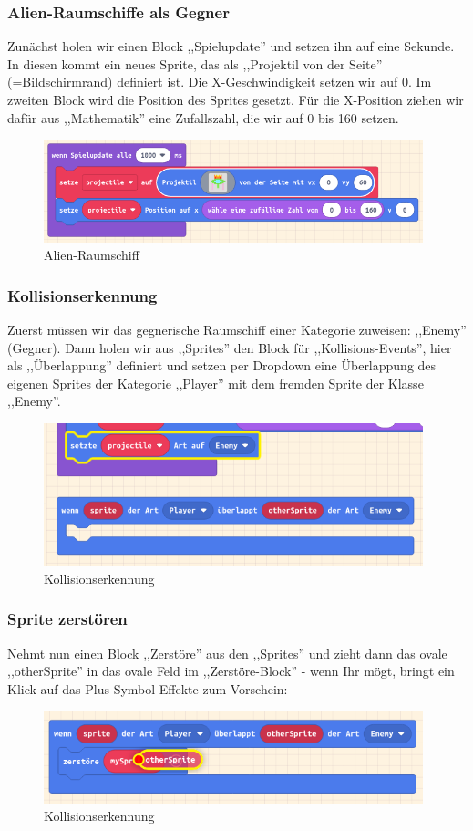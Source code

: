 \documentclass{beamer}
\begin{document}
 \begin{frame}
 \frametitle{Alien-Raumschiffe als Gegner}
 Zunächst holen wir einen Block ,,Spielupdate'' und setzen ihn auf eine Sekunde. In diesen kommt ein neues Sprite, das als ,,Projektil von der Seite'' (=Bildschirmrand) definiert ist. Die X-Geschwindigkeit setzen wir auf 0. Im zweiten Block wird die Position des Sprites gesetzt. Für die X-Position ziehen wir dafür aus ,,Mathematik'' eine Zufallszahl, die wir auf 0 bis 160 setzen.
 
 \begin{figure}
  \includegraphics[width=11cm]{game03.png}
  \caption{Alien-Raumschiff}
  \label{fig:game3}
\end{figure}
\end{frame}

 \begin{frame}
 \frametitle{Kollisionserkennung}
 Zuerst müssen wir das gegnerische Raumschiff einer Kategorie zuweisen: ,,Enemy'' (Gegner). Dann holen wir aus ,,Sprites'' den Block für ,,Kollisions-Events'', hier als ,,Überlappung'' definiert und setzen per Dropdown eine Überlappung des eigenen Sprites der Kategorie ,,Player'' mit dem fremden Sprite der Klasse ,,Enemy''.
 
 \begin{figure}
  \includegraphics[width=11cm]{game04.png}
  \caption{Kollisionserkennung}
  \label{fig:game4}
\end{figure}
\end{frame}


 \begin{frame}
 \frametitle{Sprite zerstören}
Nehmt nun einen Block ,,Zerstöre'' aus den ,,Sprites'' und zieht dann das ovale ,,otherSprite'' in das ovale Feld im ,,Zerstöre-Block'' - wenn Ihr mögt, bringt ein Klick auf das Plus-Symbol Effekte zum Vorschein:
 
 \begin{figure}
  \includegraphics[width=11cm]{game05.png}
  \caption{Kollisionserkennung}
  \label{fig:game4}
\end{figure}
\end{frame}
\end{document}
